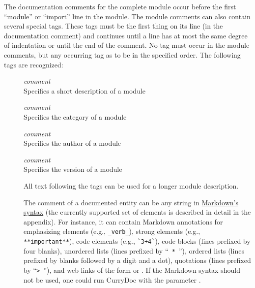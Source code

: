 The documentation comments for the complete module occur before
the first ``module'' or ``import'' line in the module.
The module comments can also contain several special tags. These tags
must be the first thing on its line (in the documentation comment)
and continues until a line has at most the same degree of indentation or
until the end of the comment.
No tag must occur in the module comments, but any
occurring tag as to be in the specified order.
The following tags are recognized:
\begin{description}
\item[] \emph{comment}\\
Specifies a short description of a module
\item[] \emph{comment}\\
Specifies the category of a module
\item[] \emph{comment}\\
Specifies the author of a module
\item[] \emph{comment}\\
Specifies the version of a module

All text following the tags can be used for a longer module description.

The comment of a documented entity can be any string in
\href{http://en.wikipedia.org/wiki/Markdown}{Markdown's syntax}
(the currently supported set of elements
is described in detail in the appendix).
For instance, it can contain Markdown annotations for
emphasizing elements (e.g., \verb!_verb_!),
strong elements (e.g., \verb!**important**!),
code elements (e.g., \verb!`3+4`!), code blocks (lines prefixed by four blanks),
unordered lists (lines prefixed by  ``\verb! * !''),
ordered lists (lines prefixed by blanks followed by a digit and a dot),
quotations (lines prefixed by ``\verb!> !''),
and web links of the form 
or .
If the Markdown syntax should not be used, one could run CurryDoc
with the parameter .


\end{description}
